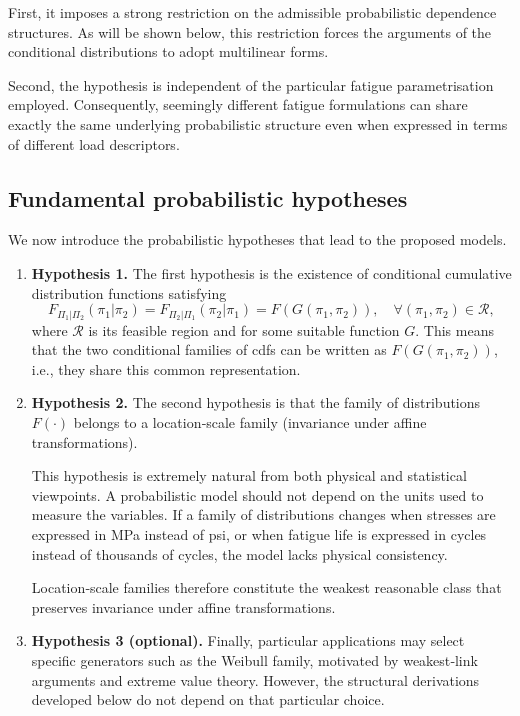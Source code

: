 First, it imposes a strong restriction on the admissible probabilistic dependence structures. As will be shown below, this restriction forces the arguments of the conditional distributions to adopt multilinear forms.

Second, the hypothesis is independent of the particular fatigue parametrisation employed. Consequently, seemingly different fatigue formulations can share exactly the same underlying probabilistic structure even when expressed in terms of different load descriptors.

\subsection{Fundamental probabilistic hypotheses}

We now introduce the probabilistic hypotheses that lead to the proposed models.

\begin{enumerate}
    \item {\bf Hypothesis 1.} The first hypothesis is the existence of conditional cumulative distribution functions satisfying
    \begin{equation}
    F_{\Pi_1|\Pi_2}(\pi_1|\pi_2) = F_{\Pi_2|\Pi_1}(\pi_2|\pi_1) = F\!\left(G(\pi_1,\pi_2)\right), \quad \forall (\pi_1,\pi_2) \in \mathcal{R},
    \label{eq:generalconditional}
    \end{equation}
    where $\mathcal{R}$ is its feasible region and for some suitable function $G$. This means that the two conditional families of cdfs can be written as $F\!\left(G(\pi_1,\pi_2)\right)$, i.e., they share this common representation.

    \item {\bf Hypothesis 2.} The second hypothesis is that the family of distributions $F(\cdot)$ belongs to a location‑scale family (invariance under affine transformations).

    This hypothesis is extremely natural from both physical and statistical viewpoints. A probabilistic model should not depend on the units used to measure the variables. If a family of distributions changes when stresses are expressed in MPa instead of psi, or when fatigue life is expressed in cycles instead of thousands of cycles, the model lacks physical consistency.

    Location‑scale families therefore constitute the weakest reasonable class that preserves invariance under affine transformations.

    \item {\bf Hypothesis 3 (optional).} Finally, particular applications may select specific generators such as the Weibull family, motivated by weakest‑link arguments and extreme value theory. However, the structural derivations developed below do not depend on that particular choice.
\end{enumerate}

